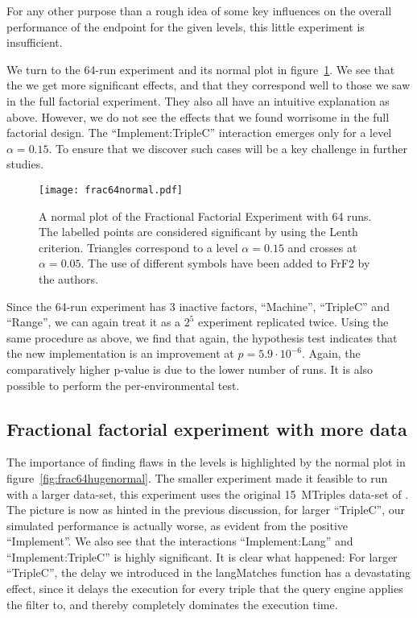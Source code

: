 \documentclass{llncs}
\begin{document}
For any other purpose than a rough idea of some key influences on the
overall performance of the endpoint for the given levels, this little
experiment is insufficient.

We turn to the 64-run experiment and its normal plot in
figure~\ref{fig:frac64normal}. We see that the we get more significant
effects, and that they correspond well to those we saw in the full
factorial experiment. They also all have an intuitive
explanation as above. However, we do not see the effects that we found
worrisome in the full factorial design. The ``Implement:TripleC''
interaction emerges only for a level $\alpha=0.15$. To ensure that we discover such
cases will be a key challenge in further studies.

\begin{figure}[ht]
  \texttt{[image: frac64normal.pdf]}
  \caption{A normal plot of the Fractional Factorial Experiment with
    64 runs. The labelled points are considered significant by using
    the Lenth criterion. Triangles correspond to a level $\alpha=0.15$
    and crosses at $\alpha=0.05$. The use of different symbols have
    been added to FrF2 by the authors.}\label{fig:frac64normal}
\end{figure}

Since the 64-run experiment has 3 inactive factors, ``Machine'',
``TripleC'' and ``Range'', we can again treat it as a $2^5$ experiment
replicated twice. Using the same procedure as above, we find that
again, the hypothesis test indicates that the new implementation is an
improvement at $p = 5.9 \cdot 10^{-6}$. Again, the comparatively higher p-value
is due to the lower number of runs. It is also possible to perform the
per-environmental test.


\subsection{Fractional factorial experiment with more data}\label{sec:hugefrac}

The importance of finding flaws in the levels is highlighted by the
normal plot in figure~\ref{fig:frac64hugenormal}. The smaller
experiment made it feasible to run with a larger data-set, this
experiment uses the original 15~MTriples data-set of
\cite{mxro:Morsey2011DBpedia}. The picture is now as hinted in the
previous discussion, for larger ``TripleC'', our simulated performance
is actually worse, as evident from the positive ``Implement''. We also
see that the interactions ``Implement:Lang'' and ``Implement:TripleC''
is highly significant. It is clear what happened: For larger
``TripleC'', the delay we introduced in the langMatches function has a
devastating effect, since it delays the execution for every triple
that the query engine applies the filter to, and thereby completely
dominates the execution time.
\end{document}
